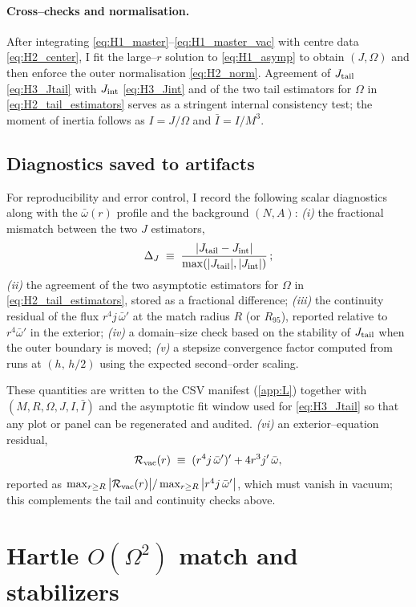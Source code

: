 \documentclass{iopjournal}
\begin{document}
\paragraph{Cross–checks and normalisation.}
After integrating \eqref{eq:H1_master}--\eqref{eq:H1_master_vac} with centre data \eqref{eq:H2_center}, I fit the large–$r$ solution to \eqref{eq:H1_asymp} to obtain $(J,\Omega)$ and then enforce the outer normalisation \eqref{eq:H2_norm}. Agreement of $J_{\rm tail}$ \eqref{eq:H3_Jtail} with $J_{\rm int}$ \eqref{eq:H3_Jint} and of the two tail estimators for $\Omega$ in \eqref{eq:H2_tail_estimators} serves as a stringent internal consistency test; the moment of inertia follows as $I=J/\Omega$ and $\bar I=I/M^{3}$.

\subsection{Diagnostics saved to artifacts}\label{app:H4}
For reproducibility and error control, I record the following scalar diagnostics along with the $\bar\omega(r)$ profile and the background $(N,A)$:
\emph{(i)} the fractional mismatch between the two $J$ estimators,
\[
\Delta_J\;\equiv\;\frac{|J_{\rm tail}-J_{\rm int}|}{\max(|J_{\rm tail}|,|J_{\rm int}|)}\,;
\]
\emph{(ii)} the agreement of the two asymptotic estimators for $\Omega$ in \eqref{eq:H2_tail_estimators}, stored as a fractional difference;
\emph{(iii)} the continuity residual of the flux $r^{4}j\,\bar\omega'$ at the match radius $R$ (or $R_{95}$), reported relative to $r^{4}\bar\omega'$ in the exterior;
\emph{(iv)} a domain–size check based on the stability of $J_{\rm tail}$ when the outer boundary is moved;
\emph{(v)} a stepsize convergence factor computed from runs at $(h,\,h/2)$ using the expected second–order scaling.

These quantities are written to the CSV manifest (\cref{app:L}) together with $(M,R,\Omega,J,I,\bar I)$ and the asymptotic fit window used for \eqref{eq:H3_Jtail} so that any plot or panel can be regenerated and audited.
\emph{(vi)} an exterior–equation residual,
\[
\mathcal{R}_{\rm vac}(r)\;\equiv\;(r^{4}j\,\bar\omega')'+4r^{3}j'\,\bar\omega,
\]
reported as $\max_{r\ge R}\big|\mathcal{R}_{\rm vac}(r)\big|/\max_{r\ge R}\big|r^{4}j\,\bar\omega'\big|$, which must vanish in vacuum; this complements the tail and continuity checks above.

\section{\texorpdfstring{Hartle $O(\Omega^{2})$ match and stabilizers}{Hartle O(Ω²) match and stabilizers}}
\label{app:I}
\end{document}
